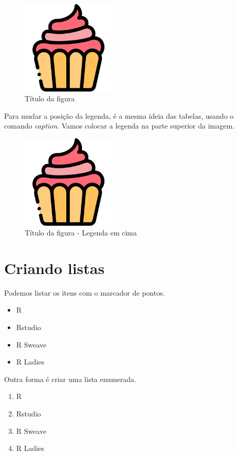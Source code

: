 \documentclass[12pt,a4paper]{article}
\begin{document}
\begin{figure}[h!]
\centering
\includegraphics[width=0.4\textwidth]{bolinho.png}
\caption{Título da figura}
\label{fig:teste}
\end{figure}

Para mudar a posição da legenda, é a mesma ideia das tabelas, usando o comando \textit{caption}. Vamos colocar a legenda na parte superior da imagem.

\begin{figure}[!]
\centering
\caption{Título da figura - Legenda em cima}
\label{fig:teste2}
\includegraphics[width=0.4\textwidth]{bolinho.png}
\end{figure}


\newpage

\section{Criando listas}

Podemos listar os itens com o marcador de pontos.  

\begin{itemize}
\item R
\item Rstudio
\item R Sweave
\item R Ladies
\end{itemize}

Outra forma é criar uma lista enumerada. 
\begin{enumerate}
\item R
\item Rstudio
\item R Sweave
\item R Ladies
\end{enumerate}
\end{document}
